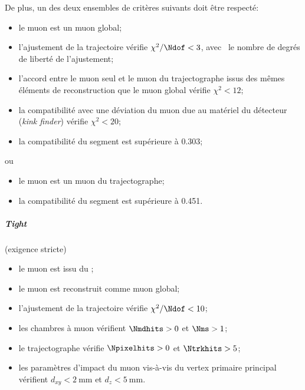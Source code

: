 De plus, un des deux ensembles de critères suivants doit être respecté:
\begin{itemize}
\item le muon est un muon global;
\item l'ajustement de la trajectoire vérifie $\chi^2/\Ndof<3$, avec \Ndof\ le nombre de degrés de liberté de l'ajustement;
\item l'accord entre le muon seul et le muon du trajectographe issus des mêmes éléments de reconstruction que le muon global vérifie $\chi^2<12$;
\item la compatibilité avec une déviation du muon due au matériel du détecteur (\emph{kink finder}) vérifie $\chi^2<20$;
\item la compatibilité du segment est supérieure à \num{0.303};
\end{itemize}
ou
\begin{itemize}
\item le muon est un muon du trajectographe;
\item la compatibilité du segment est supérieure à \num{0.451}.
\end{itemize}
\subparagraph{\emph{Tight} \muonID} (exigence stricte)
\begin{itemize}
\item le muon est issu du \PF;
\item le muon est reconstruit comme muon global;
\item l'ajustement de la trajectoire vérifie $\chi^2/\Ndof<10$;
\item les chambres à muon vérifient $\Nmdhits>0$ et $\Nms>1$;
\item le trajectographe vérifie $\Npixelhits>0$ et $\Ntrkhits>5$;
\item les paramètres d'impact du muon vis-à-vis du vertex primaire principal vérifient $d_{xy} < \SI{2}{\milli\meter}$ et $d_z<\SI{5}{\milli\meter}$.
\end{itemize}
